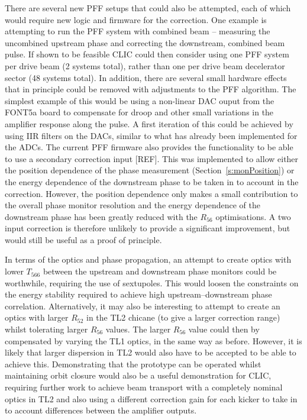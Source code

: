 There are several new PFF setups that could also be attempted, each of which would require new logic and firmware for the correction. One example is attempting to run the PFF system with combined beam -- measuring the uncombined upstream phase and correcting the downstream, combined beam pulse. If shown to be feasible CLIC could then consider using one PFF system per drive beam (2 systems total), rather than one per drive beam decelerator sector (48 systems total). In addition, there are several small hardware effects that in principle could be removed with adjustments to the PFF algorithm. The simplest example of this would be using a non-linear DAC ouput from the FONT5a board to compensate for droop and other small variations in the amplifier response along the pulse. A first iteration of this could be achieved by using IIR filters on the DACs, similar to what has already been implemented for the ADCs. The current PFF firmware also provides the functionality to be able to use a secondary correction input [REF]. This was implemented to allow either the position dependence of the phase measurement (Section~\ref{s:monPosition}) or the energy dependence of the downstream phase to be taken in to account in the correction. However, the position dependence only makes a small contribution to the overall phase monitor resolution and the energy dependence of the downstream phase has been greatly reduced with the \(R_{56}\) optimisations. A two input correction is therefore unlikely to provide a significant improvement, but would still be useful as a proof of principle.

In terms of the optics and phase propagation, an attempt to create optics with lower \(T_{566}\) between the upstream and downstream phase monitors could be worthwhile, requiring the use of sextupoles. This would loosen the constraints on the energy stability required to achieve high upstream--downstream phase correlation. Alternatively, it may also be interesting to attempt to create an optics with larger \(R_{52}\) in the TL2 chicane (to give a larger correction range) whilst tolerating larger \(R_{56}\) values. The larger \(R_{56}\) value could then by compensated by varying the TL1 optics, in the same way as before. However, it is likely that larger dispersion in TL2 would also have to be accepted to be able to achieve this. Demonstrating that the prototype can be operated whilst maintaining orbit closure would also be a useful demonstration for CLIC, requiring further work to achieve beam transport with a completely nominal optics in TL2 and also using a different correction gain for each kicker to take in to account differences between the amplifier outputs.









